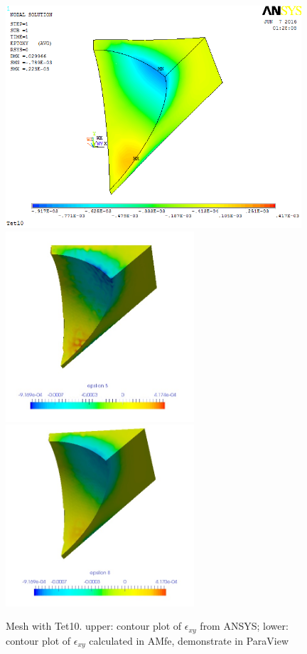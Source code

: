 \begin{figure}[htbp]
	\begin{center}
		\includegraphics[width=11cm,clip]{Tet10_Exy.png} 	
		\includegraphics[width=7cm,clip]{Tet10_Exy_PD.png} 		
		\includegraphics[width=7cm,clip]{Tet10_Exy_P.png} 		
		\caption{Mesh with Tet10. upper: contour plot of $\epsilon_{xy}$ from ANSYS; lower: contour plot of $\epsilon_{xy}$ calculated in AMfe, demonstrate in ParaView} \label{fig: Tet10_Exy}
	\end{center}
\end{figure}
\clearpage 

